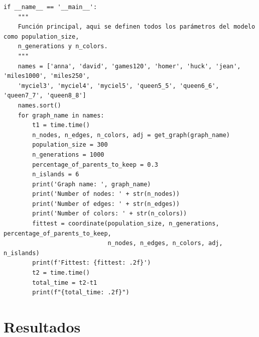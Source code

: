 \documentclass{article}
\begin{document}
{\begin{verbatim}
if __name__ == '__main__':
    """
    Función principal, aqui se definen todos los parámetros del modelo como population_size,
    n_generations y n_colors.
    """
    names = ['anna', 'david', 'games120', 'homer', 'huck', 'jean', 'miles1000', 'miles250',
    'myciel3', 'myciel4', 'myciel5', 'queen5_5', 'queen6_6', 'queen7_7', 'queen8_8']
    names.sort()
    for graph_name in names:
        t1 = time.time()
        n_nodes, n_edges, n_colors, adj = get_graph(graph_name)
        population_size = 300
        n_generations = 1000 
        percentage_of_parents_to_keep = 0.3
        n_islands = 6
        print('Graph name: ', graph_name)
        print('Number of nodes: ' + str(n_nodes))
        print('Number of edges: ' + str(n_edges))
        print('Number of colors: ' + str(n_colors))
        fittest = coordinate(population_size, n_generations, percentage_of_parents_to_keep,
                             n_nodes, n_edges, n_colors, adj, n_islands)
        print(f'Fittest: {fittest: .2f}')
        t2 = time.time()
        total_time = t2-t1
        print(f"{total_time: .2f}")
\end{verbatim}
}
\newpage 
\section{Resultados}
\end{document}
